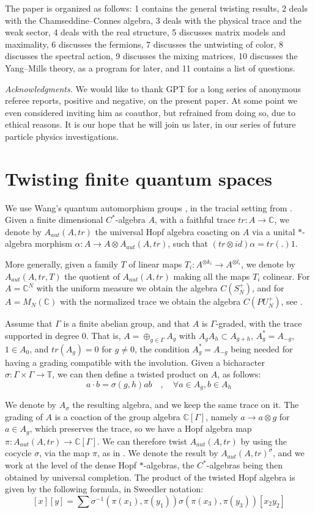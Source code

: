 \documentclass[11pt]{amsart}
\theoremstyle{definition}
\begin{document}
The paper is organized as follows: 1 contains the general twisting results, 2 deals with the Chamseddine--Connes algebra, 3 deals with the physical trace and the weak sector, 4 deals with the real structure, 5 discusses matrix models and maximality, 6 discusses the fermions, 7 discusses the untwisting of color, 8 discusses the spectral action, 9 discusses the mixing matrices, 10 discusses the Yang--Mills theory, as a program for later, and 11 contains a list of questions.

\medskip

{\em Acknowledgments.} We would like to thank GPT for a long series of anonymous referee reports, positive and negative, on the present paper. At some point we even considered inviting him as coauthor, but refrained from doing so, due to ethical reasons. It is our hope that he will join us later, in our series of future particle physics investigations.

\section{Twisting finite quantum spaces}

We use Wang's quantum automorphism groups \cite{wan}, in the tracial setting from \cite{ban}. Given a finite dimensional $C^*$-algebra $A$, with a faithful trace $tr:A\to\mathbb C$, we denote by $A_{aut}(A,tr)$ the universal Hopf algebra coacting on $A$ via a unital $*$-algebra morphism $\alpha:A\to A\otimes A_{aut}(A,tr)$, such that $(tr\otimes id)\alpha=tr(.)1$.

More generally, given a family $T$ of linear maps $T_i:A^{\otimes k_i}\to A^{\otimes l_i}$, we denote by $A_{aut}(A,tr,T)$ the quotient of $A_{aut}(A,tr)$ making all the maps $T_i$ colinear. For $A=\mathbb C^N$ with the uniform measure we obtain the algebra $C(S_N^+)$, and for $A=M_N(\mathbb C)$ with the normalized trace we obtain the algebra $C(PU_N^+)$, see \cite{ban,wan}.

Assume that $\Gamma$ is a finite abelian group, and that $A$ is $\Gamma$-graded, with the trace supported in degree $0$. That is, $A=\oplus_{g\in\Gamma}A_g$ with $A_gA_h\subset A_{g+h}$, $A_g^*=A_{-g}$, $1\in A_0$, and $tr(A_g)=0$ for $g\neq0$, the condition $A_g^*=A_{-g}$ being needed for having a grading compatible with the involution. Given a bicharacter $\sigma:\Gamma\times\Gamma\to\mathbb T$, we can then define a twisted product on $A$, as follows:
$$a\cdot b=\sigma(g,h)ab\quad,\quad\forall a\in A_g,b\in A_h$$

We denote by $A_\sigma$ the resulting algebra, and we keep the same trace on it. The grading of $A$ is a coaction of the group algebra $\mathbb C[\Gamma]$, namely $a\to a\otimes g$ for $a\in A_g$, which preserves the trace, so we have a Hopf algebra map $\pi:A_{aut}(A,tr)\to\mathbb C[\Gamma]$. We can therefore twist $A_{aut}(A,tr)$ by using the cocycle $\sigma$, via the map $\pi$, as in \cite{bbc,doi}. We denote the result by $A_{aut}(A,tr)^\sigma$, and we work at the level of the dense Hopf $*$-algebras, the $C^*$-algebras being then obtained by universal completion. The product of the twisted Hopf algebra is given by the following formula, in Sweedler notation:
$$[x][y]=\sum\sigma^{-1}(\pi(x_1),\pi(y_1))\sigma(\pi(x_3),\pi(y_3))[x_2y_2]$$
\end{document}
